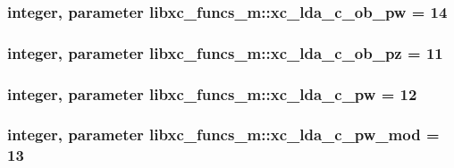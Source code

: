 \hypertarget{classlibxc__funcs__m_a23ba2d11f7919c8438b43844d99cdf8c}{
\subsubsection[{xc\-\_\-lda\-\_\-c\-\_\-ob\-\_\-pw}]{\setlength{\rightskip}{0pt plus 5cm}integer, parameter libxc\-\_\-funcs\-\_\-m\-::xc\-\_\-lda\-\_\-c\-\_\-ob\-\_\-pw = 14}}\label{classlibxc__funcs__m_a23ba2d11f7919c8438b43844d99cdf8c}
\hypertarget{classlibxc__funcs__m_aaf322096b7bd8ccf9ec1dc90418d3a97}{
\subsubsection[{xc\-\_\-lda\-\_\-c\-\_\-ob\-\_\-pz}]{\setlength{\rightskip}{0pt plus 5cm}integer, parameter libxc\-\_\-funcs\-\_\-m\-::xc\-\_\-lda\-\_\-c\-\_\-ob\-\_\-pz = 11}}\label{classlibxc__funcs__m_aaf322096b7bd8ccf9ec1dc90418d3a97}
\hypertarget{classlibxc__funcs__m_ae5f597a8e13edda4713e411142436818}{
\subsubsection[{xc\-\_\-lda\-\_\-c\-\_\-pw}]{\setlength{\rightskip}{0pt plus 5cm}integer, parameter libxc\-\_\-funcs\-\_\-m\-::xc\-\_\-lda\-\_\-c\-\_\-pw = 12}}\label{classlibxc__funcs__m_ae5f597a8e13edda4713e411142436818}
\hypertarget{classlibxc__funcs__m_a27b05939d77a777fad458dfd11b36113}{
\subsubsection[{xc\-\_\-lda\-\_\-c\-\_\-pw\-\_\-mod}]{\setlength{\rightskip}{0pt plus 5cm}integer, parameter libxc\-\_\-funcs\-\_\-m\-::xc\-\_\-lda\-\_\-c\-\_\-pw\-\_\-mod = 13}}\label{classlibxc__funcs__m_a27b05939d77a777fad458dfd11b36113}

